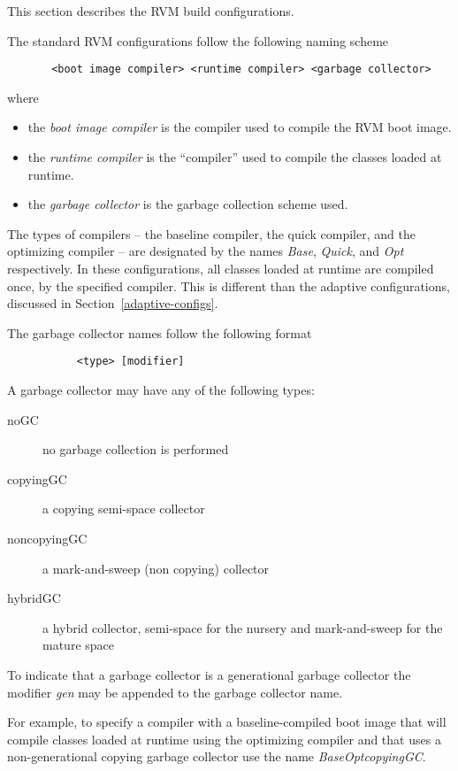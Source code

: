This section describes the RVM build configurations.

The standard RVM configurations follow the following naming scheme
\begin{verbatim}
       <boot image compiler> <runtime compiler> <garbage collector>
\end{verbatim}

where
\begin{itemize}
\item the {\em boot image compiler} is the compiler used to compile the RVM boot image.
\item the {\em runtime compiler} is the ``compiler'' used to compile
the classes loaded at runtime.  
\item the {\em garbage collector} is the garbage collection scheme used.
\end{itemize}

The types of compilers -- the baseline compiler, the quick compiler, and 
the optimizing compiler -- are designated by the names {\em Base},
{\em Quick},  and {\em Opt} respectively.  In these configurations,
all classes loaded at runtime are compiled once, by the specified
compiler.  This is different than the adaptive configurations,
discussed in Section~\ref{adaptive-configs}.

The garbage collector names follow the following format
\begin{verbatim}
           <type> [modifier]
\end{verbatim}

A garbage collector may have any of the following types:

\begin{description}
\item[noGC] no garbage collection is performed
\item[copyingGC] a copying semi-space collector
\item[noncopyingGC] a mark-and-sweep (non copying) collector
\item[hybridGC] a hybrid collector, semi-space for the nursery and
mark-and-sweep for the mature space
\end{description}

To indicate that a garbage collector is a generational garbage collector 
the modifier {\em gen} may be appended to the garbage collector name.

For example, to specify a compiler with a baseline-compiled boot image
that will 
compile classes loaded at runtime using the optimizing compiler and that uses
a non-generational copying garbage collector use the name 
{\em BaseOptcopyingGC}.

